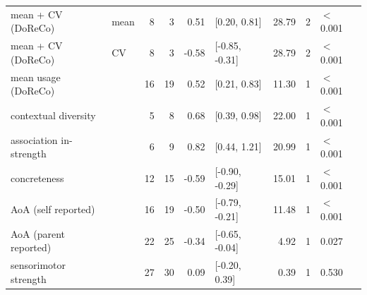 \begin{table}[ht]
\begin{tabular}{llrrrlrrl}
  mean + CV (DoReCo) & mean & 8 & 3 & 0.51 & [0.20, 0.81] & 28.79 & 2 & $<$ 0.001 \\ 
  mean + CV (DoReCo) & CV & 8 & 3 & -0.58 & [-0.85, -0.31] & 28.79 & 2 & $<$ 0.001 \\ 
  mean usage (DoReCo) &  & 16 & 19 & 0.52 & [0.21, 0.83] & 11.30 & 1 & $<$ 0.001 \\ 
  contextual diversity &  & 5 & 8 & 0.68 & [0.39, 0.98] & 22.00 & 1 & $<$ 0.001 \\ 
  association in-strength &  & 6 & 9 & 0.82 & [0.44, 1.21] & 20.99 & 1 & $<$ 0.001 \\ 
  concreteness &  & 12 & 15 & -0.59 & [-0.90, -0.29] & 15.01 & 1 & $<$ 0.001 \\ 
  AoA (self reported) &  & 16 & 19 & -0.50 & [-0.79, -0.21] & 11.48 & 1 & $<$ 0.001 \\ 
  AoA (parent reported) &  & 22 & 25 & -0.34 & [-0.65, -0.04] & 4.92 & 1 & 0.027 \\ 
  sensorimotor strength &  & 27 & 30 & 0.09 & [-0.20, 0.39] & 0.39 & 1 & 0.530 \\ 
   \hline
\end{tabular}
\end{table}
